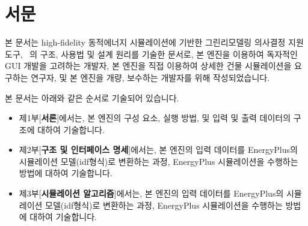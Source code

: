 \documentclass[oneside,openany,a4paper,12pt]{book}
\begin{document}
\pagestyle{plain} 



\section*{서문}
본 문서는 high-fidelity 동적에너지 시뮬레이션에 기반한 그린리모델링 의사결정 지원 도구, \simulator~\releaseversion 의 구조, 사용법 및 설계 원리를 기술한 문서로, 본 엔진을 이용하여 독자적인 GUI 개발을 고려하는 개발자, 본 엔진을 직접 이용하여 상세한 건물 시뮬레이션을 요구하는 연구자, 및 본 엔진을 개량, 보수하는 개발자를 위해 작성되었습니다.

본 문서는 아래와 같은 순서로 기술되어 있습니다.
\begin{itemize}
  \item 제1부[{\bfseries 서론}]에서는, 본 엔진의 구성 요소, 실행 방법, 및 입력 및 출력 데이터의 구조에 대하여 기술합니다.
  \item 제2부[{\bfseries 구조 및 인터페이스 명세}]에서는, 본 엔진의 입력 데이터를 EnergyPlus의 시뮬레이션 모델(idf형식)로 변환하는 과정, EnergyPlus 시뮬레이션을 수행하는 방법에 대하여 기술합니다.
  \item 제3부[{\bfseries 시뮬레이션 알고리즘}]에서는, 본 엔진의 입력 데이터를 EnergyPlus의 시뮬레이션 모델(idf형식)로 변환하는 과정, EnergyPlus 시뮬레이션을 수행하는 방법에 대하여 기술합니다.
\end{itemize}

\tableofcontents       
\listoffigures          
\listoftables          


\clearpage      
{}

\mainmatter






\backmatter



\end{document}
